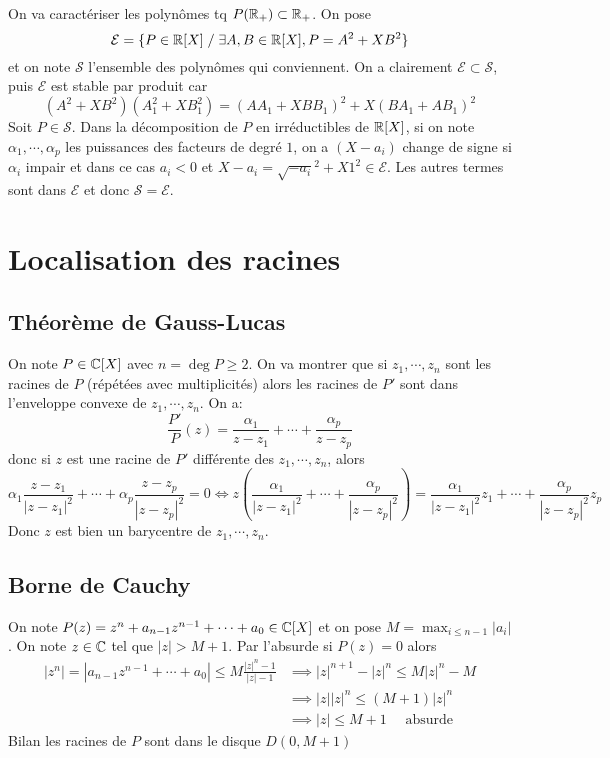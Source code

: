 On va caractériser les polynômes tq $P(\mathbb R_+)\subset \mathbb R_+$.
On pose \[
    \mathcal E=\{P\in\mathbb R[X] \;/\; \exists A, B\in\mathbb R[X], P=A^2+XB^2\}
\]
et on note $\mathcal S$ l'ensemble des polynômes qui conviennent. On a clairement $\mathcal E\subset \mathcal S$, puis $\mathcal E$ est stable par produit car \[
    (A^2+XB^2)(A_1^2+XB_1^2)=(AA_1+XBB_1)^2+X(BA_1+AB_1)^2
\]
Soit $P\in\mathcal S$. Dans la décomposition de $P$ en irréductibles de $\mathbb R[X]$, si on note $\alpha_1, \cdots, \alpha_p$ les puissances des facteurs de degré $1$, on a $(X-a_i)$ change de signe si $\alpha_i$ impair et dans ce cas $a_i<0$ et $X-a_i=\sqrt{-a_i}^2+X1^2\in\mathcal E$. Les autres termes sont dans $\mathcal E$ et donc $\mathcal S=\mathcal E$.

\section{Localisation des racines}

\subsection{Théorème de Gauss-Lucas}


On note $P\in\mathbb C[X]$ avec $n=\deg P\geq 2$. On va montrer que si $z_1, \cdots, z_n$ sont les racines de $P$ (répétées avec multiplicités) alors les racines de $P'$ sont dans l'enveloppe convexe de $z_1, \cdots, z_n$. On a:
\[
    \frac{P'}P(z)=\frac{\alpha_1}{z-z_1}+\cdots +\frac{\alpha_p}{z-z_p}
\]
donc si $z$ est une racine de $P'$ différente des $z_1, \cdots, z_n$, alors \[
    \alpha_1\frac{z-z_1}{|z-z_1|^2}+\cdots+\alpha_p\frac{z-z_p}{|z-z_p|^2}=0 \iff z \left( \frac{\alpha_1}{|z-z_1|^2}+\cdots+\frac{\alpha_p}{|z-z_p|^2} \right)=\frac{\alpha_1}{|z-z_1|^2}z_1+\cdots+\frac{\alpha_p}{|z-z_p|^2}z_p
\]
Donc $z$ est bien un barycentre de $z_1, \cdots, z_n$.

\subsection{Borne de Cauchy}


On note $P(z)=z^n+a_{n-1}z^{n-1}+\cdots+a_0\in\mathbb C[X]$ et on pose $M=\max_{i\leq n-1}\limits |a_i|$. On note $z\in\mathbb C$ tel que $|z|>M+1$. Par l'absurde si $P(z)=0$ alors \begin{align*}
    |z^n|=|a_{n-1}z^{n-1}+\cdots +a_0|\leq M\frac{|z|^n-1}{|z|-1} &\implies |z|^{n+1}-|z|^n\leq M|z|^n-M \\ &\implies |z| |z|^n\leq (M+1)|z|^n \\ &\implies |z|\leq M+1\quad\text{ absurde }
\end{align*}
Bilan les racines de $P$ sont dans le disque $D(0, M+1)$

